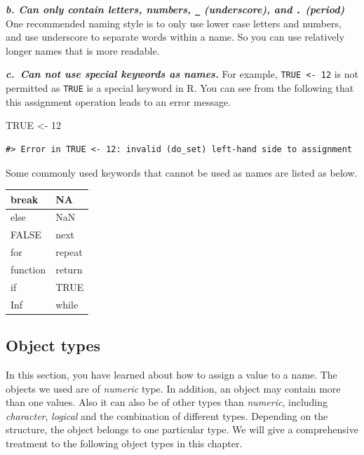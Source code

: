 \documentclass[
]{book}
\newenvironment{Shaded}{\begin{snugshade}}{\end{snugshade}}
\newcommand{\ConstantTok}[1]{\textcolor[rgb]{0.00,0.00,0.00}{#1}}
\newcommand{\DecValTok}[1]{\textcolor[rgb]{0.00,0.00,0.81}{#1}}
\newcommand{\OtherTok}[1]{\textcolor[rgb]{0.56,0.35,0.01}{#1}}
\begin{document}
\textbf{\emph{b. Can only contain letters, numbers, \texttt{\_} (underscore), and \texttt{.} (period)}}
One recommended naming style is to only use lower case letters and numbers, and use underscore to separate words within a name. So you can use relatively longer names that is more readable.

\textbf{\emph{c.~Can not use special keywords as names.}}
For example, \texttt{TRUE\ \textless{}-\ 12} is not permitted as \texttt{TRUE} is a special keyword in R. You can see from the following that this assignment operation leads to an error message.

\begin{Shaded}
\begin{Highlighting}[]
\ConstantTok{TRUE} \OtherTok{\textless{}{-}} \DecValTok{12}
\end{Highlighting}
\end{Shaded}

\begin{verbatim}
#> Error in TRUE <- 12: invalid (do_set) left-hand side to assignment
\end{verbatim}

Some commonly used keywords that cannot be used as names are listed as below.

\begin{tabular}{l|l}
\hline
break & NA\\
\hline
else & NaN\\
\hline
FALSE & next\\
\hline
for & repeat\\
\hline
function & return\\
\hline
if & TRUE\\
\hline
Inf & while\\
\hline
\end{tabular}

\hypertarget{object-types}{%
\subsection{Object types}\label{object-types}}

In this section, you have learned about how to assign a value to a name. The objects we used are of \emph{numeric} type. In addition, an object may contain more than one values. Also it can also be of other types than \emph{numeric}, including \emph{character}, \emph{logical} and the combination of different types. Depending on the structure, the object belongs to one particular type. We will give a comprehensive treatment to the following object types in this chapter.
\end{document}
